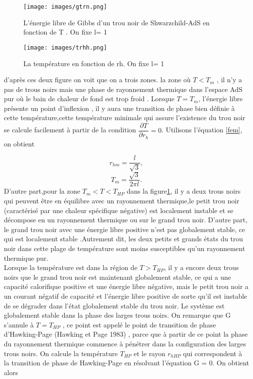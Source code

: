 \documentclass[12pt,  a4paper, openright]{report} %
\begin{document}
 \begin{figure}[H]
 \begin{center}
 	\texttt{[image: images/gtrn.png]}
\caption{L'énergie libre de Gibbs
	d'un trou noir de Shwarzchild-AdS en
	fonction de T . On fixe l= 1}
\label{gtttrn}
 \end{center}
 \end{figure}

\begin{figure}[H]
	\begin{center}
		\texttt{[image: images/trhh.png]}
		\caption{La température en fonction de rh. On fixe l= 1}
		\label{trhh}
	\end{center}
\end{figure}

 d'après ces deux figure on voit que on a trois zones. la zone où $T<T_{m}$ , il n’y a pas de trous noirs mais une phase de rayonnement thermique dans l’espace AdS pur  où le bain de chaleur de fond est trop froid
\cite{19}. Lorsque $T = T_{m}$, l’énergie libre présente un point d’inflexion , il y aura
une transition de phase bien définie à cette température,cette température minimale qui assure l’existence du trou noir se calcule facilement à partir de la condition $\dfrac{\partial T}{\partial r_{h}} = 0$. Utilisons l’équation \ref{fem}, on obtient

\begin{equation}
r_{hm}=\dfrac{l}{\sqrt{3}},
\end{equation}
\begin{equation}
T_{m}=\dfrac{\sqrt{3}}{2\pi l}.
\end{equation}
D’autre part,pour la zone $T_{m}<T<T_{HP}$ dans la figure\ref{gtttrn}, il y a deux trous noirs qui peuvent être en équilibre avec un rayonnement thermique,le petit trou noir (caractérisé par une chaleur spécifique négative) est localement instable et se décompose en un rayonnement thermique ou sur le grand trou noir. D’autre part, le grand trou noir avec une énergie libre positive n’est pas globalement stable, ce qui est localement stable .Autrement dit, les deux petits et grands états du trou noir dans cette plage de température sont moins susceptibles qu’un rayonnement thermique pur.\\
Lorsque la température est dans la région de $T > T_{HP}$, il y a encore deux trous noirs que le grand trou noir est maintenant globalement stable, ce qui a une
capacité calorifique positive et une énergie libre négative, mais le petit trou noir a un courant
négatif de capacité et l’énergie libre positive de sorte qu’il est instable de se dégrader dans l’état
globalement stable du trou noir. Le système est globalement stable dans la phase des
larges trous noirs. On remarque que G s’annule à $ T = T_{HP}$ , ce point est appelé le point de
transition de phase d’Hawking-Page (Hawking et Page 1983) \cite{20}, parce que à partir de
ce point la phase du rayonnement thermique commence à pénétrer dans la configuration
des larges trous noirs.
On calcule la température $ T_{HP}$ et le rayon $r_{hHP}$ qui correspondent à
la transition de phase de Hawking-Page en résolvant l’équation G = 0. On obtient alors
\end{document}
